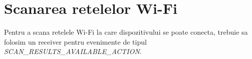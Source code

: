\section{Scanarea retelelor Wi-Fi}

Pentru a scana retelele Wi-Fi la care dispozitivului se poate conecta, trebuie sa folosim un receiver pentru evenimente de
tipul \textit{SCAN\_RESULTS\_AVAILABLE\_ACTION}.
